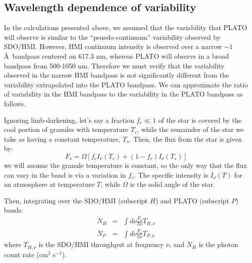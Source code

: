 \subsection{Wavelength dependence of variability}

In the calculations presented above, we assumed that the variability that PLATO will observe is similar to the ``psuedo-continuum'' variability observed by SDO/HMI. However, HMI continuum intensity is observed over a narrow $\sim 1$ \AA\ bandpass centered on 617.3 nm, whereas PLATO will observe in a broad bandpass from 500-1050 nm. Therefore we must verify that the variability observed in the narrow HMI bandpass is not significantly different from the variability extrapolated into the PLATO bandpass. We can approximate the ratio of variability in the HMI bandpass to the variability in the PLATO bandpass as follows.

Ignoring limb-darkening, let's say a fraction $f_c \ll 1$ of the star is covered by the cool portion of granules with temperature $T_c$, while the remainder of the star we take as having a constant temperature, $T_s$.
Then, the flux from the star is given by:
\begin{equation}
F _ { \nu } = \Omega \left[ f _ { c } I _ { \nu } \left( T _ { c } \right) + \left( 1- f _ { c } \right) I _ { \nu } \left( T _ { s } \right) \right]
\end{equation}
we will assume the granule temperature is constant, so the only way that the flux can vary in the \kepler band is via a variation in $f_c$.  The specific intensity is $I_\nu(T)$ for an atmosphere at temperature $T$, while $\Omega$ is the solid angle of the star.

Then, integrating over the SDO/HMI (subscript $H$) and PLATO (subscript $P$) bands:
\begin{eqnarray}
\dot { N } _ { H } &=& \int d \nu \frac { F _ { \nu } } { h \nu } T _ { H ,\nu } \\ 
\dot { N } _ { P } &=& \int d \nu \frac { F _ { \nu } } { h \nu } T _ { P ,\nu }
\end{eqnarray}
where $T_{H,\nu}$ is the SDO/HMI throughput at frequency $\nu$, and $\dot{N}_H$ is the photon count rate (cm$^2$ s$^{-1}$).

